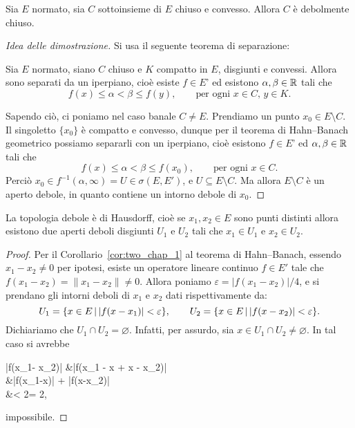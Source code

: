 \begin{theorem}
	Sia $E$ normato, sia $C$ sottoinsieme di $E$ chiuso e convesso.
	Allora $C$ è debolmente chiuso.
\end{theorem}
\begin{proof}[Idea delle dimostrazione]
	Si usa il seguente teorema di separazione:
	\begin{theorem}
	\label{th:geom_hahn_banach}
		Sia $E$ normato, siano $C$ chiuso e $K$ compatto in $E$, disgiunti e convessi.
		Allora sono separati da un iperpiano, cioè esiste $f \in E$' ed esistono $\alpha, \beta \in \mathbb{R}$ tali che
		\begin{equation*}
			f(x) \leq \alpha < \beta \leq f(y), \qquad \text{per ogni $x \in C$, $y \in K$.}
		\end{equation*}
	\end{theorem}
	Sapendo ciò, ci poniamo nel caso banale $C \neq E$. Prendiamo un punto $x_0 \in E \setminus C$. Il singoletto $\{x_0\}$ è compatto e convesso, dunque per il teorema di Hahn--Banach geometrico possiamo separarli con un iperpiano, cioè esistono $f \in E$' ed $\alpha, \beta \in \mathbb{R}$ tali che
	\begin{equation*}
		f(x) \leq \alpha < \beta \leq f(x_0), \qquad \text{per ogni $x \in C$}.
	\end{equation*}
	Perciò $x_0 \in f^{-1}(\alpha, \infty) = U \in \sigma(E, E')$, e $U \subseteq E \setminus C$. Ma allora $E \setminus C$ è un aperto debole, in quanto contiene un intorno debole di $x_0$.
\end{proof}

\begin{lemma}
	La topologia debole è di Hausdorff, cioè se $x_1, x_2 \in E$ sono punti distinti allora esistono due aperti deboli disgiunti $U_1$ e $U_2$ tali che $x_1 \in U_1$ e $x_2 \in U_2$.
\end{lemma}
\begin{proof}
	Per il Corollario~\ref{cor:two_chap_1} al teorema di Hahn--Banach, essendo $x_1 - x_2 \neq 0$ per ipotesi, esiste un operatore lineare continuo $f \in E'$ tale che $f(x_1 - x_2) = \|x_1 - x_2\| \neq 0$. Allora poniamo $\varepsilon = |f(x_1-x_2)|/4$, e si prendano gli intorni deboli di $x_1$ e $x_2$ dati rispettivamente da:
	\begin{equation*}
		U_1 = \{x \in E \,|\, |f(x-x_1)| < \varepsilon \}, \qquad U_2 = \{x \in E \,|\, |f(x-x_2)| < \varepsilon \}.
	\end{equation*}
	Dichiariamo che $U_1 \cap U_2 = \varnothing$. Infatti, per assurdo, sia $x \in U_1 \cap U_2 \neq \varnothing$. In tal caso si avrebbe
	\begin{eqalign*}
		|f(x_1- x_2)| &\leq |f(x_1 - x + x - x_2)|\\
		&\leq |f(x_1-x)| + |f(x-x_2)|\\
		&< 2\varepsilon = 2,
	\end{eqalign*}
	impossibile.
\end{proof}

